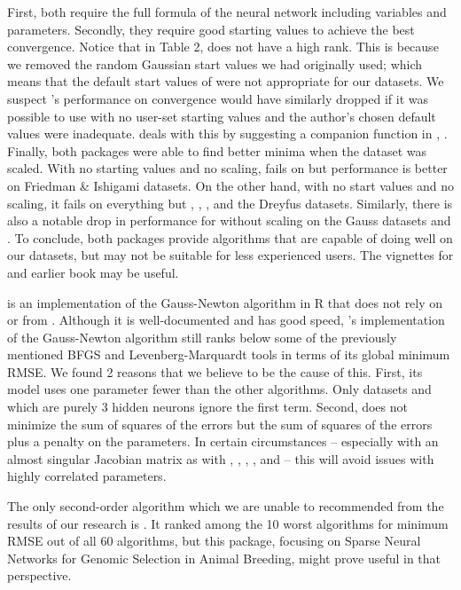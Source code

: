 First, both require the full formula of the neural network including
variables and parameters. Secondly, they require good starting values to
achieve the best convergence. Notice that in Table 2, 
does not have a high rank. This is because we removed the random
Gaussian start values we had originally used; which means that the
default start values of  were not appropriate for our
datasets. We suspect 's performance on convergence would have
similarly dropped if it was possible to use  with no user-set
starting values and the author's chosen default values were inadequate.
 deals with this by suggesting a companion function in
, . Finally, both packages were able to find
better minima when the dataset was scaled. With no starting values and
no scaling,  fails on  but
performance is better on Friedman \& Ishigami datasets. On the other
hand, with no start values and no scaling, it fails on everything but
, , , and the Dreyfus
datasets. Similarly, there is also a notable drop in performance for
 without scaling on the Gauss datasets and . To
conclude, both packages provide algorithms that are capable of doing
well on our datasets, but may not be suitable for less experienced
users. The vignettes for  and earlier book
\citep{Nash-nlpor14} may be useful.

 \citep{R-brnn} is an implementation of the Gauss-Newton
algorithm in R that does not rely on  or  from
. Although it is well-documented and has good speed,
's implementation of the Gauss-Newton algorithm still ranks
below some of the previously mentioned BFGS and Levenberg-Marquardt
tools in terms of its global minimum RMSE. We found 2 reasons that we
believe to be the cause of this. First, its model uses one parameter
fewer than the other algorithms. Only datasets  and
 which are purely 3 hidden neurons ignore the first
term. Second,  does not minimize the sum of squares of the
errors but the sum of squares of the errors plus a penalty on the
parameters. In certain circumstances -- especially with an almost
singular Jacobian matrix as with , ,
, , and  -- this will avoid
issues with highly correlated parameters.

The only second-order algorithm which we are unable to recommended from
the results of our research is  \citep{R-snnR}. It ranked
among the 10 worst algorithms for minimum RMSE out of all 60 algorithms,
but this package, focusing on Sparse Neural Networks for Genomic
Selection in Animal Breeding, might prove useful in that perspective.

